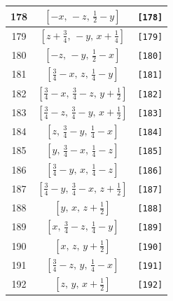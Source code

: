\documentclass[fleqn,8pt]{jsarticle}
\begin{document}
\begin{longtable}{ccc}
178 & $\left[ - x,\, - z,\, \frac{1}{2} - y \right]$ & {\tt [178]} \\ \hline
179 & $\left[ z + \frac{3}{4},\, - y,\, x + \frac{1}{4} \right]$ & {\tt [179]} \\ \hline
180 & $\left[ - z,\, - y,\, \frac{1}{2} - x \right]$ & {\tt [180]} \\ \hline
181 & $\left[ \frac{3}{4} - x,\, z,\, \frac{1}{4} - y \right]$ & {\tt [181]} \\ \hline
182 & $\left[ \frac{3}{4} - x,\, \frac{3}{4} - z,\, y + \frac{1}{2} \right]$ & {\tt [182]} \\ \hline
183 & $\left[ \frac{3}{4} - z,\, \frac{3}{4} - y,\, x + \frac{1}{2} \right]$ & {\tt [183]} \\ \hline
184 & $\left[ z,\, \frac{3}{4} - y,\, \frac{1}{4} - x \right]$ & {\tt [184]} \\ \hline
185 & $\left[ y,\, \frac{3}{4} - x,\, \frac{1}{4} - z \right]$ & {\tt [185]} \\ \hline
186 & $\left[ \frac{3}{4} - y,\, x,\, \frac{1}{4} - z \right]$ & {\tt [186]} \\ \hline
187 & $\left[ \frac{3}{4} - y,\, \frac{3}{4} - x,\, z + \frac{1}{2} \right]$ & {\tt [187]} \\ \hline
188 & $\left[ y,\, x,\, z + \frac{1}{2} \right]$ & {\tt [188]} \\ \hline
189 & $\left[ x,\, \frac{3}{4} - z,\, \frac{1}{4} - y \right]$ & {\tt [189]} \\ \hline
190 & $\left[ x,\, z,\, y + \frac{1}{2} \right]$ & {\tt [190]} \\ \hline
191 & $\left[ \frac{3}{4} - z,\, y,\, \frac{1}{4} - x \right]$ & {\tt [191]} \\ \hline
192 & $\left[ z,\, y,\, x + \frac{1}{2} \right]$ & {\tt [192]} \\
\end{longtable}
\end{document}
